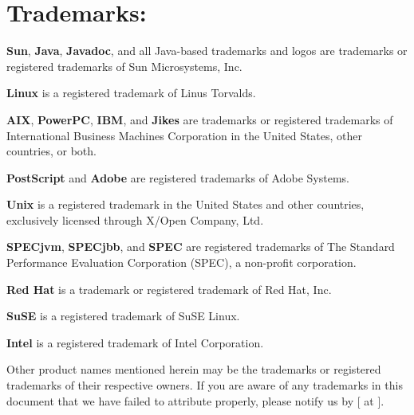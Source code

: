 \section*{Trademarks:}
\label{trademarks}

{\bf Sun}, {\bf Java}, {\bf Javadoc}, and all Java-based trademarks
and logos are trademarks or registered trademarks of Sun Microsystems,
Inc. 

{\bf Linux} is a registered trademark of Linus Torvalds.

{\bf AIX}, {\bf PowerPC}, {\bf IBM}, and {\bf Jikes} are
trademarks or 
registered trademarks of International Business Machines Corporation in the
United States, other countries, or both.

{\bf PostScript} and {\bf Adobe} are registered trademarks of Adobe Systems.

{\bf Unix} is a registered trademark in the United States and other
countries, exclusively licensed through X/Open Company, Ltd.

{\bf SPECjvm}, {\bf SPECjbb}, and {\bf SPEC} are registered
trademarks of The Standard Performance Evaluation Corporation (SPEC),
a non-profit corporation. 

{\bf Red Hat} is a trademark or registered trademark of Red Hat, Inc.

{\bf SuSE} is a registered trademark of SuSE Linux.

{\bf Intel} is a registered trademark of Intel Corporation.

Other product names mentioned herein may be the trademarks or
registered trademarks of their respective owners.  If you are aware of
any trademarks in this document that we have failed to attribute
properly, please notify us by [ at {\tt \RVMBugURL}]{\RVMBugURL}.

